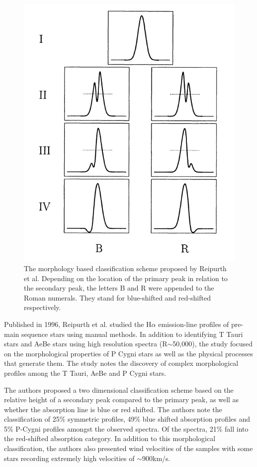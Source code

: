 \begin{figure}[!htb]
\centering
\includegraphics[scale=0.75]{figures/reipurth classes.png}
\caption{The morphology based classification scheme proposed by Reipurth et al. Depending on the location of the primary peak in relation to the secondary peak, the letters B and R were appended to the Roman numerals. They stand for blue-shifted and red-shifted respectively.}
\end{figure}

Published in 1996, Reipurth et al. studied the H$\alpha$ emission-line profiles of pre-main sequence stars using manual methods. In addition to identifying T Tauri stars and AeBe stars using high resolution spectra (R$\sim$50,000), the study focused on the morphological properties of P Cygni stars as well as the physical processes that generate them. The study notes the discovery of complex morphological profiles among the T Tauri, AeBe and P Cygni stars. 

The authors proposed a two dimensional classification scheme based on the relative height of a secondary peak compared to the primary peak, as well as whether the absorption line is blue or red shifted. The authors note the classification of 25\% symmetric profiles, 49\% blue shifted absorption profiles and 5\% P-Cygni profiles amongst the observed spectra. Of the spectra, 21\% fall into the red-shifted absorption category. In addition to this morphological classification, the authors also presented wind velocities of the samples with some stars recording extremely high velocities of $\sim$900km/s\cite{reipurth1996halpha}. 

